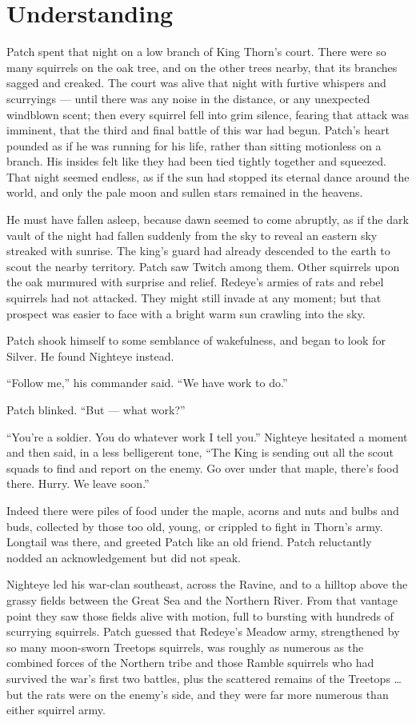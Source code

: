 \documentclass[12pt]{memoir}
\begin{document}

\section{Understanding}

Patch spent that night on a low branch of King Thorn’s court. There
were so many squirrels on the oak tree, and on the other trees nearby,
that its branches sagged and creaked. The court was alive that night
with furtive whispers and scurryings — until there was any noise in
the distance, or any unexpected windblown scent; then every squirrel
fell into grim silence, fearing that attack was imminent, that the
third and final battle of this war had begun. Patch’s heart pounded as
if he was running for his life, rather than sitting motionless on a
branch. His insides felt like they had been tied tightly together and
squeezed. That night seemed endless, as if the sun had stopped its
eternal dance around the world, and only the pale moon and sullen
stars remained in the heavens.

He must have fallen asleep, because dawn seemed to come abruptly, as
if the dark vault of the night had fallen suddenly from the sky to
reveal an eastern sky streaked with sunrise. The king’s guard had
already descended to the earth to scout the nearby territory. Patch
saw Twitch among them. Other squirrels upon the oak murmured with
surprise and relief. Redeye’s armies of rats and rebel squirrels had
not attacked. They might still invade at any moment; but that prospect
was easier to face with a bright warm sun crawling into the sky.

Patch shook himself to some semblance of wakefulness, and began to
look for Silver. He found Nighteye instead.

“Follow me,” his commander said. “We have work to do.”

Patch blinked. “But — what work?”

“You’re a soldier. You do whatever work I tell you.” Nighteye
hesitated a moment and then said, in a less belligerent tone, “The
King is sending out all the scout squads to find and report on the
enemy. Go over under that maple, there’s food there. Hurry. We leave
soon.”

Indeed there were piles of food under the maple, acorns and nuts and
bulbs and buds, collected by those too old, young, or crippled to
fight in Thorn’s army. Longtail was there, and greeted Patch like an
old friend. Patch reluctantly nodded an acknowledgement but did not
speak.

Nighteye led his war-clan southeast, across the Ravine, and to a
hilltop above the grassy fields between the Great Sea and the Northern
River. From that vantage point they saw those fields alive with
motion, full to bursting with hundreds of scurrying squirrels. Patch
guessed that Redeye’s Meadow army, strengthened by so many moon-sworn
Treetops squirrels, was roughly as numerous as the combined forces of
the Northern tribe and those Ramble squirrels who had survived the
war’s first two battles, plus the scattered remains of the Treetops …
but the rats were on the enemy’s side, and they were far more numerous
than either squirrel army.
\end{document}
